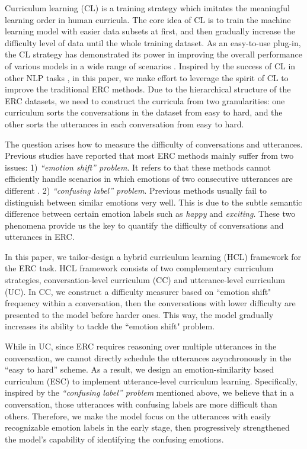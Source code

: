 \documentclass[letterpaper]{article} \usepackage{aaai22}  \usepackage{times}  \usepackage{helvet}  \usepackage{courier}  \usepackage[hyphens]{url}  \usepackage{graphicx} \urlstyle{rm} \def\UrlFont{\rm}  \usepackage{natbib}  \usepackage{caption} \DeclareCaptionStyle{ruled}{labelfont=normalfont,labelsep=colon,strut=off} \frenchspacing  \setlength{\pdfpagewidth}{8.5in}  \setlength{\pdfpageheight}{11in}
\begin{document}
Curriculum learning (CL) \cite{bengio2009curriculum} is a training strategy which imitates the meaningful learning order in human curricula. The core idea of CL is to train the machine learning model with easier data subsets at first, and then gradually increase the difficulty level of data until the whole training dataset. As an easy-to-use plug-in, the CL strategy has demonstrated its power in improving the overall performance of various models in a wide range of scenarios \cite{wang2020survey}. Inspired by the success of CL in other NLP tasks \cite{zhou2020uncertainty,liu2018curriculum,su2020dialogue}, in this paper, we make effort to leverage the spirit of CL to improve the traditional ERC methods. Due to the hierarchical structure of the ERC datasets, we need to construct the curricula from two granularities: one curriculum sorts the conversations in the dataset from easy to hard, and the other sorts the utterances in each conversation from easy to hard. 

The question arises how to measure the difficulty of conversations and utterances.  Previous studies \cite{majumder2019dialoguernn,shen2021dialogxl} have reported that most ERC methods mainly suffer from two issues:
1) \emph{``emotion shift'' problem}. It refers to that these methods cannot efficiently handle scenarios in which emotions of two consecutive utterances are different \cite{ghosal-etal-2021-exploring}. 2) \emph{``confusing label'' problem}. Previous methods \cite{ghosal2019dialoguegcn,shen2021directed} usually fail to distinguish between similar emotions very well. This is due to the subtle semantic difference between certain emotion labels such as \emph{happy} and \emph{exciting}. These two phenomena provide us the key to quantify the difficulty of conversations and utterances in ERC.


In this paper, we tailor-design a hybrid curriculum learning (HCL) framework for the ERC task. HCL framework consists of two complementary curriculum strategies, conversation-level curriculum (CC) and utterance-level curriculum (UC). 
In CC, we construct a difficulty measurer based on ``emotion shift" frequency within a conversation, then the conversations with lower difficulty are presented to the model before harder ones. This way, the model gradually increases its ability to tackle the ``emotion shift" problem. 

While in UC, since ERC requires reasoning over multiple utterances in the conversation, we cannot directly schedule the utterances asynchronously in the “easy to hard” scheme. As a result, we design an emotion-similarity based curriculum (ESC) to implement utterance-level curriculum learning. Specifically, inspired by the \emph{``confusing label'' problem} mentioned above, we believe that in a conversation, those utterances with confusing labels are more difficult than others.  Therefore, we make the model focus on the utterances with easily recognizable emotion labels in the early stage, then progressively strengthened the model’s capability of identifying the confusing emotions. 
\end{document}
